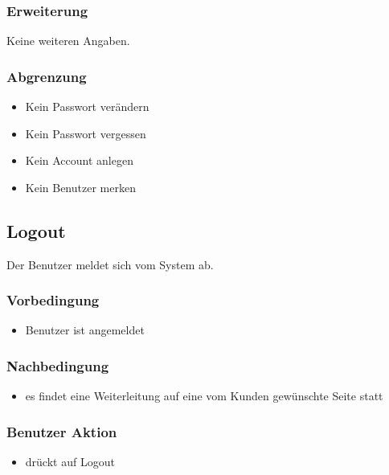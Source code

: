 \documentclass[a4paper,12pt]{article}
\begin{document}
\subsubsection{Erweiterung}\label{erweiterung}
Keine weiteren Angaben.

\subsubsection{Abgrenzung}\label{abgrenzung}

\begin{itemize}
\item
  Kein Passwort verändern
\item
  Kein Passwort vergessen
\item
  Kein Account anlegen
\item
  Kein Benutzer merken
\end{itemize}

\subsection{Logout}\label{logout}
Der Benutzer meldet sich vom System ab.

\subsubsection{Vorbedingung}\label{vorbedingung-1}

\begin{itemize}
\item
  Benutzer ist angemeldet
\end{itemize}

\subsubsection{Nachbedingung}\label{nachbedingung-1}

\begin{itemize}
\item
  es findet eine Weiterleitung auf eine vom Kunden gewünschte Seite
  statt
\end{itemize}

\subsubsection{Benutzer Aktion}\label{benutzer-aktion-1}

\begin{itemize}
\item
  drückt auf Logout
\end{itemize}
\end{document}
